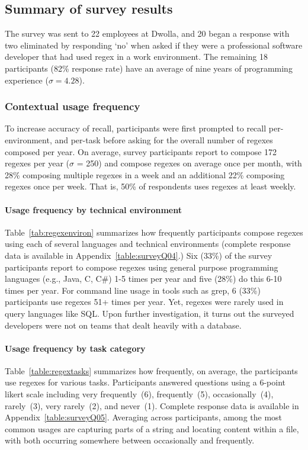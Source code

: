 \subsection{Summary of survey results}
\label{sec:surveyResults}

The survey was sent to 22 employees at Dwolla, and 20 began a response with two eliminated by responding `no' when asked if they were a professional software developer that had used regex in a work environment.  The remaining 18 participants (82\% response rate) have an average of nine years of programming experience ($\sigma = 4.28$).

\subsubsection{Contextual usage frequency}
\label{sec:compositionFrequency}
To increase accuracy of recall, participants were first prompted to recall per-environment, and per-task before asking for the overall number of regexes composed per year.  On average, survey participants report to compose 172 regexes per year ($\sigma$ = 250) and compose regexes on average once per month, with 28\% composing multiple regexes in a week and an additional 22\% composing regexes once per week. That is, 50\% of respondents uses regexes at least weekly.



\paragraph{Usage frequency by technical environment} Table~\ref{tab:regexenviron} summarizes how frequently participants compose regexes using each of several languages and technical environments (complete response data is available in Appendix~\ref{table:surveyQ04}.)  Six (33\%) of the survey participants report to compose regexes using general purpose programming languages (e.g., Java, C, C\#) 1-5 times per year and five (28\%) do this 6-10 times per year.  For command line usage in tools such as grep, 6 (33\%) participants use regexes 51+ times per year. Yet, regexes were rarely used in query languages like SQL. Upon further investigation, it turns out the surveyed developers were not on teams that dealt heavily with a database.



\paragraph{Usage frequency by task category} Table~\ref{table:regextasks} summarizes how frequently, on average, the participants use
regexes for various tasks.
Participants answered questions using a 6-point likert scale including very frequently~(6), frequently~(5), occasionally~(4), rarely~(3), very rarely~(2), and never~(1).  Complete response data is available in Appendix~\ref{table:surveyQ05}.  Averaging across participants, among the most common usages are capturing parts of a string and locating content within a file, with both occurring somewhere between occasionally and frequently.

